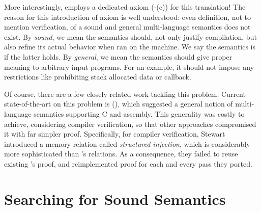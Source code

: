 {More interestingly, \cc{} employs a dedicated axiom (-(c)) for this translation!
The reason for this introduction of axiom is well understood: even definition, not to mention verification, of a sound and general multi-language semantics does not exist.
By \textit{sound}, we mean the semantics %
should, not only justify compilation, but also refine its actual behavior when ran on the machine.
We say the semantics is \lbound{} if the latter holds.
By \textit{general}, we mean the semantics should give proper meaning to arbitrary input programs.
For an example, it should not impose any restrictions like prohibiting stack allocated data or callback.


Of course, there are a few closely related work tackling this problem.
Current state-of-the-art on this problem is \ccc{}(\cccfull\cite{stewart:ccc}), which suggested a general notion of multi-language semantics supporting C and assembly.
This generality was costly to achieve, considering compiler verification, so that other approaches \cite{gu:dscal, wang:saccx} compromised it with far simpler proof.
Specifically, for compiler verification, Stewart \etal{} introduced a memory relation called \textit{structured injection}, which is considerably more sophisticated than \cc{}'s relations.
As a consequence, they failed to reuse existing \cc{}'s proof, and reimplemented proof for each and every pass they ported.





\section{Searching for Sound Semantics}\label{sec:introduction:semantics}

}
